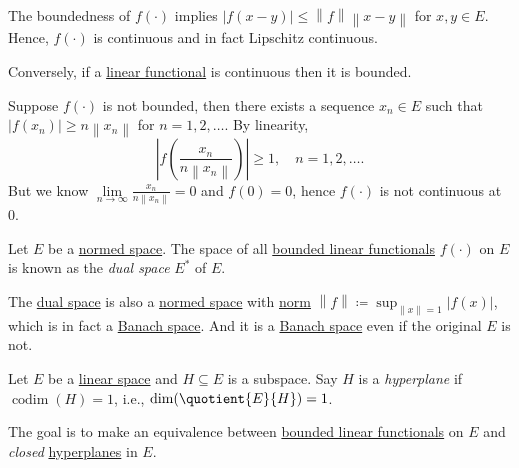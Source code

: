 \begin{remark}
	The boundedness of \(f(\cdot)\) implies \(\left\vert f(x-y) \right\vert \leq \left\lVert f\right\rVert \left\lVert x-y\right\rVert \) for \(x, y\in E\). Hence, \(f(\cdot)\) is continuous and in fact Lipschitz continuous.
\end{remark}

\begin{remark}
	Conversely, if a \hyperref[def:linear-functional]{linear functional} is continuous then it is bounded.
\end{remark}
\begin{explanation}
	Suppose \(f(\cdot)\) is not bounded, then there exists a sequence \(x_n\in E\) such that \(\left\vert f(x_n) \right\vert \geq n \left\lVert x_n\right\rVert \) for \(n = 1, 2, \ldots  \). By linearity,
	\[
		\left\vert f \left( \frac{x_{n} }{n \left\lVert x_{n} \right\rVert } \right) \right\vert \geq 1, \quad n = 1, 2, \ldots.
	\]
	But we know \(\lim\limits_{n \to \infty} \frac{x_{n} }{n \left\lVert x_{n} \right\rVert }=0\) and \(f(0) = 0\), hence \(f(\cdot)\) is not continuous at \(0\).
\end{explanation}

\begin{definition}\label{def:dual-space}
	Let \(E\) be a \hyperref[def:normed-vector-space]{normed space}. The space of all \hyperref[def:bounded-linear-functional]{bounded linear functionals} \(f(\cdot)\) on \(E\) is known as the \emph{dual space} \(E^{\ast} \) of \(E\).
\end{definition}
\begin{remark}
	The \hyperref[def:dual-space]{dual space} is also a \hyperref[def:normed-vector-space]{normed space} with \hyperref[def:norm]{norm} \(\left\lVert f\right\rVert \coloneqq \sup _{\left\lVert x\right\rVert = 1}\left\vert f(x) \right\vert \), which is in fact a \hyperref[def:Banach-space]{Banach space}. And it is a \hyperref[def:Banach-space]{Banach space} even if the original \(E\) is not.
\end{remark}

\begin{definition}[Hyperplane]\label{def:hyperplane}
	Let \(E\) be a \hyperref[def:linear-vector-space]{linear space} and \(H\subseteq E\) is a subspace. Say \(H\) is a \emph{hyperplane} if \(\mathop{\mathrm{codim}}(H)=1\), i.e., \(\dim (\quotient{E}{H})=1\).
\end{definition}

The goal is to make an equivalence between \hyperref[def:bounded-linear-functional]{bounded linear functionals} on \(E\) and \emph{closed} \hyperref[def:hyperplane]{hyperplanes} in \(E\).

